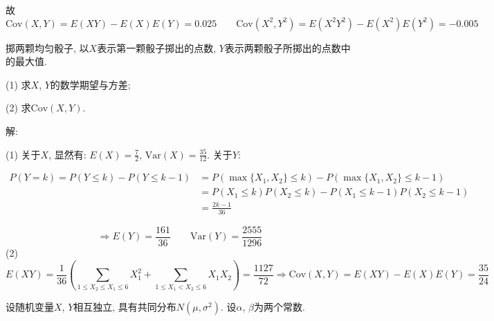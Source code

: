 \documentclass[standard]{ExBook}
\begin{document}
\begin{qitems}
\vspace{-5em}

    \begin{bbox}
故
$$\mathrm{Cov}(X,Y)=E(XY)-E(X)E(Y)=0.025 \qquad \mathrm{Cov}(X^2,Y^2)=E(X^2 Y^2)-E(X^2)E(Y^2)=-0.005$$
    \end{bbox}

\vspace{-5em}

    \begin{bbox}
    \begin{shaded}
        \qitem
掷两颗均匀骰子, 以$X$表示第一颗骰子掷出的点数, $Y$表示两颗骰子所掷出的点数中的最大值.

(1) 求$X$, $Y$的数学期望与方差;

(2) 求$\mathrm{Cov}(X,Y)$.
    \end{shaded}
    \end{bbox}

\vspace{-5em}

    \begin{bbox}
解: 

(1) 关于$X$, 显然有: $E(X)=\displaystyle\frac{7}{2}$, $\mathrm{Var}(X)=\displaystyle\frac{35}{12}$. 关于$Y$:
\vspace{-2em}
\begin{center}
\begin{equation}
    \begin{array}{ll}
        \nonumber
P(Y=k)=P(Y\leq k)-P(Y\leq k-1) & =P(\max\{X_1,X_2\}\leq k)-P(\max\{X_1,X_2\}\leq k-1)\\
 & =P(X_1\leq k)P(X_2\leq k)-P(X_1\leq k-1)P(X_2\leq k-1)\\
 & =\displaystyle\frac{2k-1}{36}
    \end{array}
\end{equation}
\end{center}
$$\Longrightarrow E(Y)=\frac{161}{36} \qquad \mathrm{Var}(Y)=\frac{2555}{1296}$$
(2)
$$E(XY)=\displaystyle\frac{1}{36}\left(\sum\limits_{1\leq X_2\leq X_1\leq 6}X_1^2+\sum\limits_{1\leq X_1<X_2\leq 6}X_1 X_2\right)=\frac{1127}{72} \Longrightarrow \mathrm{Cov}(X,Y)=E(XY)-E(X)E(Y)=\frac{35}{24}$$
    \end{bbox}

\vspace{-5em}

    \begin{bbox}
    \begin{shaded}
        \qitem
设随机变量$X$, $Y$相互独立, 具有共同分布$N(\mu,\sigma^2)$. 设$\alpha$, $\beta$为两个常数.


\end{shaded}
\end{bbox}
\end{qitems}
\end{document}
